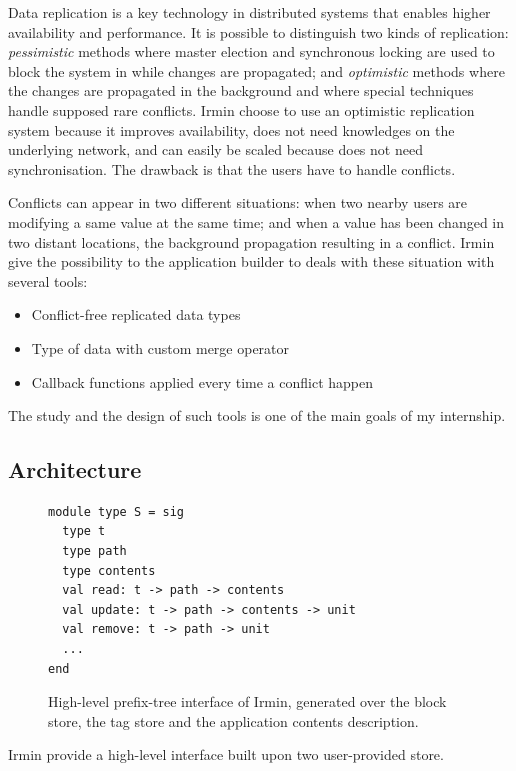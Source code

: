 \documentclass{article}
\renewcommand{\-}{\hyp}
\newcommand{\irmin}{Irmin\xspace}
\begin{document}
Data replication is a key technology in distributed systems that enables higher availability and performance.
It is possible to distinguish two kinds of replication:
\emph{pessimistic} methods where master election and synchronous locking are used to block the system in while changes are propagated;
and \emph{optimistic}\cite{OptimisticReplication2005} methods where the changes are propagated in the background and where special techniques handle supposed rare conflicts.
\irmin choose to use an optimistic replication system because it improves availability, does not need knowledges on the underlying network, and can easily be scaled because does not need synchronisation.
The drawback is that the users have to handle conflicts.

Conflicts can appear in two different situations:
when two nearby users are modifying a same value at the same time;
and when a value has been changed in two distant locations, the background propagation resulting in a conflict.
\irmin give the possibility to the application builder to deals with these situation with several tools:
\begin{itemize}
	\item Conflict-free replicated data types\cite{ConflictfreeReplicatedDataTypes2011}
	\item Type of data with custom merge operator
	\item Callback functions applied every time a conflict happen
\end{itemize}
The study and the design of such tools is one of the main goals of my internship.


\subsection{Architecture}

\begin{figure}
\begin{lstlisting}
module type S = sig
  type t
  type path
  type contents
  val read: t -> path -> contents
  val update: t -> path -> contents -> unit
  val remove: t -> path -> unit
  ...
end
\end{lstlisting}
\caption{High-level prefix-tree interface of \irmin, generated over the block store, the tag store and the application contents description.}
\label{prefix-tree}
\end{figure}

\irmin provide a high-level interface built upon two user-provided store.
\end{document}
